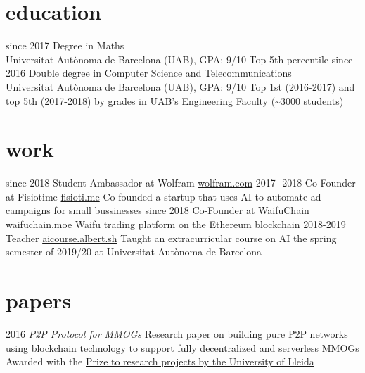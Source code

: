 \documentclass[]{friggeri-cv}
\begin{document}
\section{education}

\begin{entrylist}
  \entry
    {since 2017}
    {Degree in Maths}
    {\\Universitat Autònoma de Barcelona (UAB), GPA: 9/10}
    {Top 5th percentile}
  \entry
    {since 2016}
    {Double degree in Computer Science and Telecommunications}
    {\\Universitat Autònoma de Barcelona (UAB), GPA: 9/10}
    {Top 1st (2016-2017) and top 5th (2017-2018) by grades in UAB’s Engineering Faculty (\textasciitilde3000 students)}
\end{entrylist}

\section{work}

\begin{entrylist}
  \entry
    {since 2018}
    {Student Ambassador at Wolfram}
    {\href{https://www.wolfram.com/}{wolfram.com}}
    {}
  \entry
    {2017- 2018}
    {Co-Founder at Fisiotime}
    {\href{http://fisioti.me}{fisioti.me}}
    {Co-founded a startup that uses AI to automate ad campaigns for small bussinesses}
  \entry
    {since 2018}
    {Co-Founder at WaifuChain}
    {\href{https://waifuchain.moe}{waifuchain.moe}}
    {Waifu trading platform on the Ethereum blockchain}
  \entry
    {2018-2019}
    {Teacher}
    {\href{https://aicourse.albert.sh}{aicourse.albert.sh}}
    {Taught an extracurricular course on AI the spring semester of 2019/20 at Universitat Autònoma de Barcelona}
\end{entrylist}

\section{papers}

\begin{entrylist}
  \entry
    {2016}
    {\emph{P2P Protocol for MMOGs}}
    {}
    {Research paper on building pure P2P networks using blockchain technology to support fully decentralized and serverless MMOGs
    \\Awarded with the \href{http://eps.blogs.udl.cat/2016/06/29/argelichrecerca/}{Prize to research projects by the University of Lleida}
    }
\end{entrylist}
\end{document}
